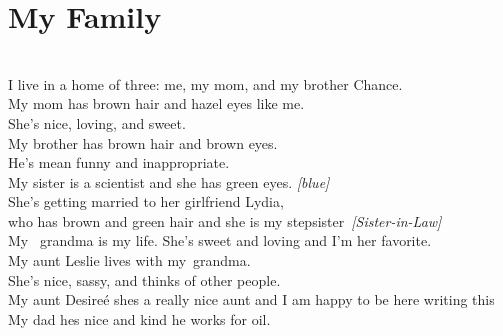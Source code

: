\documentclass[10pt]{report}
\newcommand{\fbd}{
    \setlength{\fboxsep}{0pt}
    \setlength{\fboxrule}{3pt}
  }
\begin{document}
\section*{My Family}{
  \fbd
  }
\;\\
I live in a home of three: me, my mom, and my brother Chance.\\
My mom has brown hair and hazel eyes like me. \\
She's nice, loving, and sweet.\\
My brother has brown hair and brown eyes. \\
He's mean funny and inappropriate.\\
My sister is a scientist and she has green eyes. \textit{[blue]}\\
She's getting married to her girlfriend Lydia,\\
who has brown and green hair and she is my stepsister \textit{[Sister-in-Law]}\\
My  grandma is my life.
She's sweet and loving and I'm her favorite.\\
My aunt Leslie lives with my grandma.\\
She's nice, sassy, and thinks of other people.\\
My aunt Desire\'e shes a really nice aunt and I am happy to be here writing this\\
My dad hes nice and kind he works for oil.
\clearpage
\end{document}
